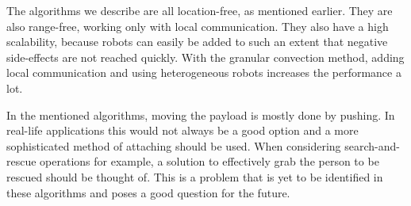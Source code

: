 The algorithms we describe are all location-free, as mentioned earlier. 
They are also range-free, working only with local communication.
They also have a high scalability, because robots can easily be added to such an extent that negative side-effects are not reached quickly.
With the granular convection method, adding local communication and using heterogeneous robots increases the performance a lot. 

  \begin{table}[H]
  \renewcommand{\arraystretch}{1.3}
    \caption{Overview of Collective Transport Algorithms}
  \label{table_alg_coltrans2}
  \centering
{}
  \end{table}



In the mentioned algorithms, moving the payload is mostly done by pushing. 
In real-life applications this would not always be a good option and a more sophisticated method of attaching should be used. 
When considering search-and-rescue operations for example, a solution to effectively grab the person to be rescued should be thought of. 
This is a problem that is yet to be identified in these algorithms and poses a good question for the future.
